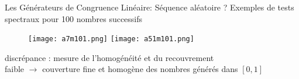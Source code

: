\documentclass{beamer}
\begin{document}
\begin{frame}{Les Générateurs de Congruence Linéaire: Séquence aléatoire ?}
  Exemples de tests spectraux pour 100 nombres successifs
    \begin{figure}
      \begin{center}
      \texttt{[image: a7m101.png]}
      \hspace{0.1\textwidth}
      \texttt{[image: a51m101.png]}
      \end{center}
    \end{figure}
    discrépance : mesure de l'homogénéité et du recouvrement\\
    faible $\rightarrow$ couverture fine et homogène des nombres générés dans $[0,1]$\\

\end{frame}
\end{document}
